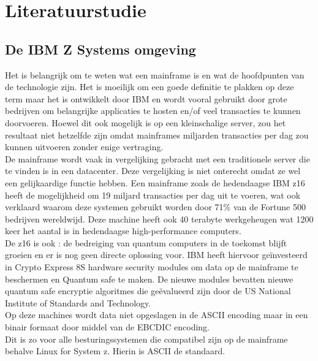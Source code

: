 
\chapter{Literatuurstudie}
\label{ch:literatuurstudie}

\section{De IBM Z Systems omgeving}
\label{sec:De IBM Z Systems omgeving}
Het is belangrijk om te weten wat een mainframe is en wat de hoofdpunten van de technologie zijn. Het is moeilijk om een goede definitie te plakken op deze term maar het is ontwikkelt door IBM en wordt vooral gebruikt door grote bedrijven om belangrijke applicaties te hosten en/of veel transacties te kunnen doorvoeren. Hoewel dit ook mogelijk is op een kleinschalige server, zou het resultaat niet hetzelfde zijn omdat mainframes miljarden transacties per dag zou kunnen uitvoeren zonder enige vertraging. \autocite{BasuMallick2023} \\

De mainframe wordt vaak in vergelijking gebracht met een traditionele server die te vinden is in een datacenter. Deze vergelijking is niet onterecht omdat ze wel een gelijkaardige functie hebben. Een mainframe zoals de hedendaagse IBM z16 heeft de mogelijkheid om 19 miljard transacties per dag uit te voeren, wat ook verklaard waarom deze systemen gebruikt worden door 71\% van de Fortune 500 bedrijven wereldwijd. Deze machine heeft ook 40 terabyte werkgeheugen wat 1200 keer het aantal is in hedendaagse high-performance computers. \autocite{Tozzi2022} \\

De z16 is ook : de bedreiging van quantum computers in de toekomst blijft groeien en er is nog geen directe oplossing voor. IBM heeft hiervoor geïnvesteerd in Crypto Express 8S hardware security modules om data op de mainframe te beschermen en Quantum safe te maken. De nieuwe modules bevatten nieuwe quantum safe encryptie algoritmes die geëvalueerd zijn door de US National Institute of Standards and Technology. \autocite{Sayer2022} \\

Op deze machines wordt data niet opgeslagen in de ASCII encoding maar in een binair formaat door middel van de EBCDIC encoding. \autocite{Singhal2023} \\ Dit is zo voor alle besturingssystemen die compatibel zijn op de mainframe behalve Linux for System z. Hierin is ASCII de standaard. \autocite{IBMb}


